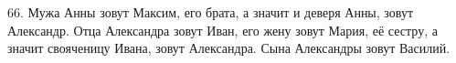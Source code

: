 66. Мужа Анны зовут Максим, его брата, а значит и деверя Анны, зовут Александр. Отца Александра зовут Иван, его жену зовут Мария, её сестру, а значит свояченицу Ивана, зовут Александра. Сына Александры зовут Василий.\\
